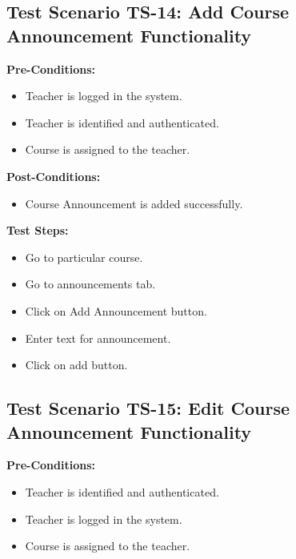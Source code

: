 \subsection{Test Scenario TS-14: Add Course Announcement Functionality}
\textbf{Pre-Conditions: }
\begin{itemize}

\item Teacher is logged in the system.
\item Teacher is identified and authenticated.
\item Course is assigned to the teacher.

\end{itemize}

\textbf{Post-Conditions: }
\begin{itemize}

\item Course Announcement is added successfully.

\end{itemize}


\textbf{Test Steps:}
\begin{itemize}

\item Go to particular course.
\item Go to announcements tab.
\item Click on Add Announcement button.
\item Enter text for announcement.
\item Click on add button.

\end{itemize}



\subsection{Test Scenario TS-15: Edit Course Announcement Functionality}
\textbf{Pre-Conditions: }
\begin{itemize}

\item Teacher is identified and authenticated.
\item Teacher is logged in the system.
\item Course is assigned to the teacher.

\end{itemize}

